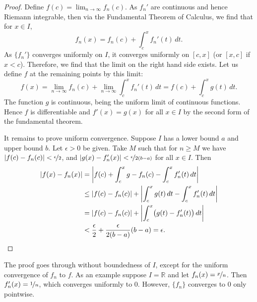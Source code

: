 \documentclass[12pt,openany]{book}
\newcommand{\abs}[1]{\left\lvert {#1} \right\rvert}
\newcommand{\R}{{\mathbb{R}}}
\theoremstyle{plain}
\theoremstyle{remark}
\theoremstyle{definition}
\theoremstyle{exercise}
\theoremstyle{example}
\begin{document}
\begin{proof}
Define $f(c) = \lim_{n\to \infty} f_n(c)$.
As $f_n'$ are continuous and hence Riemann integrable,
then
via the Fundamental Theorem of Calculus, we find that for $x \in I$,
\begin{equation*}
f_n(x) = f_n(c) + \int_c^x f_n' (t)\, dt.
\end{equation*}
As $\{ f_n' \}$ converges uniformly on $I$, it converges uniformly
on $[c,x]$ (or $[x,c]$ if $x < c$).
Therefore, we find that the limit on the right hand side exists.
Let us define $f$ at the remaining points by this limit:
\begin{equation*}
f(x) =
\lim_{n\to\infty} f_n(c) + \lim_{n\to\infty} \int_c^x f_n' (t)\, dt
=
f(c) + \int_c^x g(t)\,dt .
\end{equation*}
The function $g$ is continuous, being the uniform limit of continuous
functions.  Hence $f$ is differentiable and $f'(x) = g(x)$ for all $x \in I$
by the second form of the fundamental theorem.

It remains to prove
uniform convergence.
Suppose $I$ has a lower bound $a$ and upper bound $b$.
Let $\epsilon > 0$ be given.  Take $M$
such that for $n \geq M$ we have
$\abs{f(c)-f_n(c)} < \nicefrac{\epsilon}{2}$,
and
$\abs{g(x)-f_n'(x)} < \nicefrac{\epsilon}{2(b-a)}$
for all $x \in I$.  Then
\begin{equation*}
\begin{split}
\abs{f(x) - f_n(x)} & =
\abs{f(c) + \int_c^x g - f_n(c) - \int_c^x f_n'(t)\,dt}
\\
& \leq
\abs{f(c) - f_n(c)} + \abs{\int_c^x g(t)\,dt - \int_c^x f_n'(t)\,dt}
\\
& =
\abs{f(c) - f_n(c)} + \abs{\int_c^x \bigl(g(t) - f_n'(t)\bigr) \, dt}
\\
& <
\frac{\epsilon}{2}
+
\frac{\epsilon}{2(b-a)}
(b-a)
=\epsilon. \qedhere
\end{split}
\end{equation*}
\end{proof}

The proof goes through without boundedness of $I$, except for the
uniform convergence of $f_n$ to $f$.  As an example suppose $I = \R$ and let
$f_n(x) = \nicefrac{x}{n}$.  Then $f_n'(x)=\nicefrac{1}{n}$, which
converges uniformly to $0$.  However, $\{f_n\}$ converges to 0 only pointwise.
\end{document}
